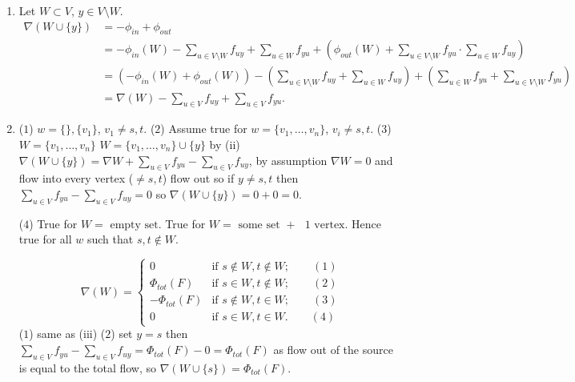 \documentclass[10pt, a4paper]{article}
\begin{document}
\begin{example}
\begin{solution}
\begin{enumerate}[label = (\roman*)]
            \item Let $W \subset V$,
            $y \in V \setminus W$.
            \begin{align*}
                \nabla(W \cup \{y\}) &= -\phi_{in} + \phi_{out} \\
                &= -\phi_{in}(W) - \sum_{u \in V \setminus W}f_{uy} + \sum_{u \in W}f_{yu} + \left(\phi_{out}(W) + \sum_{u \in V \setminus W}f_{yu} \cdot \sum_{u \in W}f_{uy}\right) \\
                &= \left(-\phi_{in}(W) + \phi_{out}(W)\right) - \left(\sum_{u \in V \setminus W}f_{uy} + \sum_{u \in W}f_{uy}\right) + \left(\sum_{u \in W}f_{yu} + \sum_{u \in V \setminus W}f_{yu}\right) \\
                &= \nabla(W) - \sum_{u \in V}f_{uy} + \sum_{u \in V}f_{yu}.
            \end{align*}

            \item
            ($1$)
            $w = \{\}, \{v_1\}$,
            $v_1 \neq s, t$.
            ($2$)
            Assume true for $w = \{v_1, \dotsc, v_n\}$,
            $v_i \neq s, t$.
            ($3$)
            $W = \{v_1, \dotsc, v_n\}$ $W = \{v_1, \dotsc, v_n\} \cup \{y\}$ by (ii) $\nabla(W \cup \{y\}) = \nabla W + \sum_{u \in V}f_{yu} - \sum_{u \in V}f_{uy}$,
            by assumption $\nabla W = 0$ and flow into every vertex
            ($\neq s, t$)
            flow out so if $y \neq s, t$ then $\sum_{u \in V}f_{yu} - \sum_{u \in V}f_{uy} = 0$ so $\nabla(W \cup \{y\}) = 0 + 0 = 0$.

            ($4$)
            True for $W = \text{ empty set}$.
            True for $W = \text{ some set $+$ $1$ vertex}$.
            Hence true for all $w$ such that $s, t \notin W$.

            \[
            \nabla(W) = \begin{cases}
                0 & \text{if } s \notin W, t \notin W;\qquad(1) \\
                \Phi_{tot}(F) & \text{if } s \in W, t \notin W;\qquad(2) \\
                -\Phi_{tot}(F) & \text{if } s \notin W, t \in W;\qquad(3) \\
                0 & \text{if } s \in W, t \in W.\qquad(4)
            \end{cases}
            \]
            ($1$) same as (iii)
            ($2$)
            set $y = s$ then $\sum_{u \in V}f_{yu} - \sum_{u \in V}f_{uy} = \Phi_{tot}(F) - 0 = \Phi_{tot}(F)$ as flow out of the source is equal to the total flow,
            so $\nabla(W \cup \{s\}) = \Phi_{tot}(F)$.


\end{enumerate}
\end{solution}
\end{example}
\end{document}
